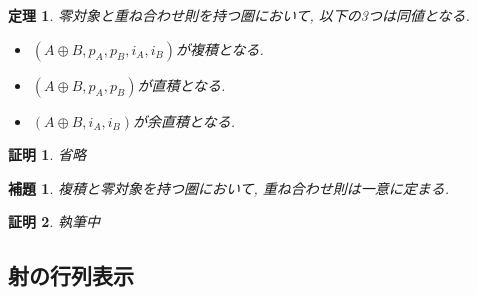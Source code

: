 \documentclass[a4paper,12pt]{ltjsarticle}
\theoremstyle{break}
\newtheorem{lem}[thm]{補題}
\newtheorem{thrm}[thm]{定理}
\newtheorem*{prf}{証明}
\newcommand{\opl}{\oplus}
\numberwithin{equation}{section}
\begin{document}
\begin{thrm}
  零対象と重ね合わせ則を持つ圏において, 以下の3つは同値となる. 
  \begin{itemize}
    \item $(A \opl B, p_A, p_B, i_A, i_B)$が複積となる. 
    \item $(A \opl B, p_A, p_B)$が直積となる. 
    \item $(A \opl B, i_A, i_B)$が余直積となる. 
  \end{itemize}
\end{thrm}

\begin{prf}
  省略
\end{prf}

\begin{lem}
  複積と零対象を持つ圏において, 重ね合わせ則は一意に定まる. 
\end{lem}

\begin{prf}
  執筆中
\end{prf}

\subsection{射の行列表示}
\end{document}
